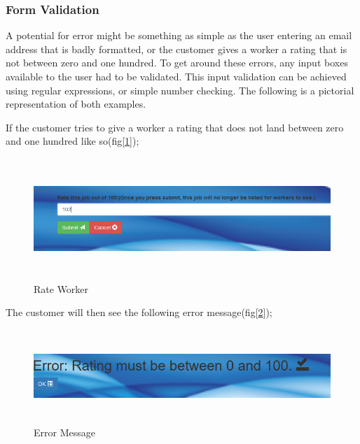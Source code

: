 \bigskip

\subsubsection{Form Validation}
\label{sec:SystemEvaluationFormValidation}
 A potential for error might be something as simple as the user entering an email address that is badly formatted, or the customer gives a worker a rating that is not between zero and one hundred. 
To get around these errors, any input boxes available to the user had to be validated. This input validation can be achieved using regular expressions, or simple number checking. The following is a pictorial representation of both examples.

If the customer tries to give a worker a rating that does not land between zero and one hundred like so(fig[\ref{fig:rate}]);

\begin{figure}[H]
    \centering
    \includegraphics[width=\textwidth, height=130pt]{img/102.PNG}
    \caption{Rate Worker}
    \label{fig:rate}
\end{figure}

\bigskip

The customer will then see the following error message(fig[\ref{fig:error}]);

\begin{figure}[H]
    \centering
   \includegraphics[width=\textwidth, height=100pt]{img/Error.PNG}
    \caption{Error Message}
    \label{fig:error}
\end{figure}

